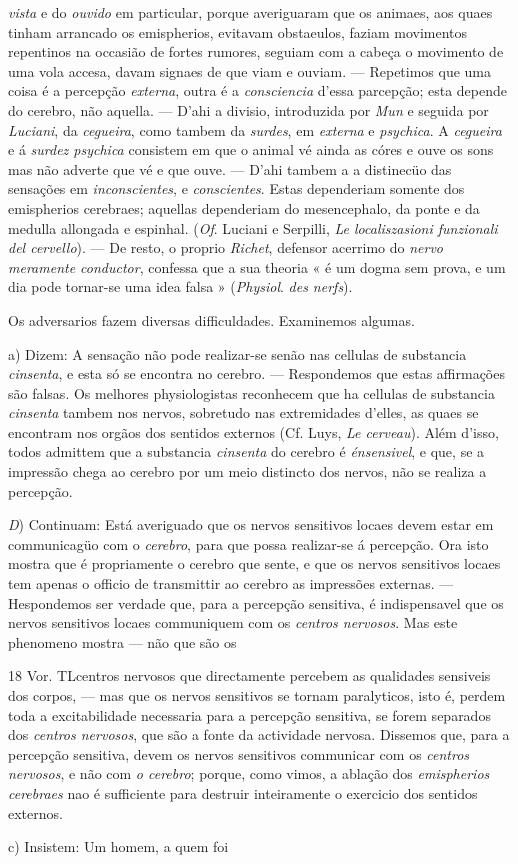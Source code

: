 \emph{vista} e do \emph{ouvido} em particular, porque averiguaram que os animaes, aos quaes tinham arrancado os emispherios, evitavam obstaeulos, faziam movimentos repentinos na occasião de fortes rumores, seguiam com a cabeça o movimento de uma vola accesa, davam signaes de que viam e ouviam. --- Repetimos que uma coisa é a percepção \emph{externa}, outra é a \emph{consciencia} d'essa parcepção; esta depende do cerebro, não aquella. --- D'ahi a divisio, introduzida por \emph{Mun} e seguida por \emph{Luciani}, da \emph{cegueira}, como tambem da \emph{surdes}, em \emph{externa} e \emph{psychica}. A \emph{cegueira} e á \emph{surdez psychica} consistem em que o animal vé ainda as córes e ouve os sons mas não adverte que vé e que ouve. --- D'ahi tambem a a distinecüo das sensações em \emph{inconscientes}, e \emph{conscientes}. Estas dependeriam somente dos emispherios cerebraes; aquellas dependeriam do mesencephalo, da ponte e da medulla allongada e espinhal. (\emph{Of}. Luciani e Serpilli, \emph{Le localiszasioni funzionali del cervello}). --- De resto, o proprio \emph{Richet}, defensor acerrimo do \emph{nervo meramente conductor}, confessa que a sua theoria « é um dogma sem prova, e um dia pode tornar-se uma idea falsa » (\emph{Physiol}. \emph{des nerfs}).\par Os adversarios fazem diversas difficuldades. Examinemos algumas.\par a) Dizem: A sensação não pode realizar-se senão nas cellulas de substancia \emph{cinsenta}, e esta só se encontra no cerebro. --- Respondemos que estas affirmações são falsas. Os melhores physiologistas reconhecem que ha cellulas de substancia \emph{cinsenta} tambem nos nervos, sobretudo nas extremidades d'elles, as quaes se encontram nos orgãos dos sentidos externos (Cf. Luys, \emph{Le cerveau}). Além d'isso, todos admittem que a substancia \emph{cinsenta} do cerebro é \emph{énsensivel}, e que, se a impressão chega ao cerebro por um meio distincto dos nervos, não se realiza a percepção.\par \emph{D}) Continuam: Está averiguado que os nervos sensitivos locaes devem estar em communicagüo com o \emph{cerebro}, para que possa realizar-se á percepção. Ora isto mostra que é propriamente o cerebro que sente, e que os nervos sensitivos locaes tem apenas o officio de transmittir ao cerebro as impressões externas. --- Hespondemos ser verdade que, para a percepção sensitiva, é indispensavel que os nervos sensitivos locaes communiquem com os \emph{centros nervosos}. Mas este phenomeno mostra --- não que são os\par 18 Vor. TLcentros nervosos que directamente percebem as qualidades sensiveis dos corpos, --- mas que os nervos sensitivos se tornam paralyticos, isto é, perdem toda a excitabilidade necessaria para a percepção sensitiva, se forem separados dos \emph{centros nervosos}, que são a fonte da actividade nervosa. Dissemos que, para a percepção sensitiva, devem os nervos sensitivos communicar com os \emph{centros nervosos}, e não com \emph{o cerebro}; porque, como vimos, a ablação dos \emph{emispherios cerebraes} nao é sufficiente para destruir inteiramente o exercicio dos sentidos externos.\par c) Insistem: Um homem, a quem foi 